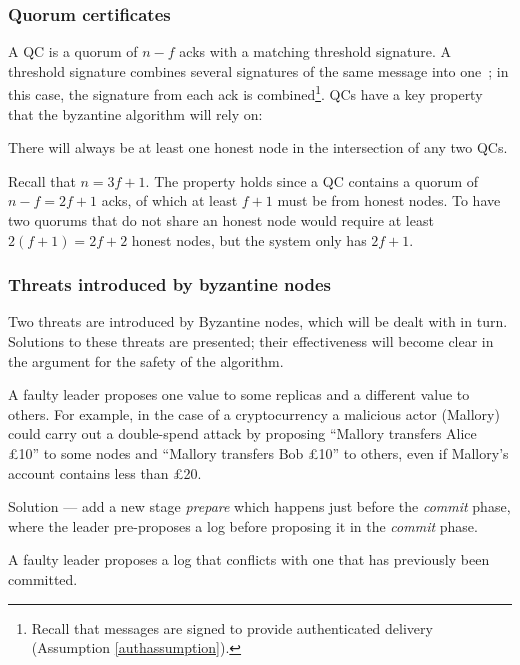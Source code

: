 \subsubsection{Quorum certificates}

A QC is a quorum of $n - f$ acks with a matching threshold signature. A threshold signature combines several signatures of the same message into one~\cite{shoupPracticalThresholdSignatures2000, cachinRandomOraclesConstantinople2005}; in this case, the signature from each ack is combined\footnote{Recall that messages are signed to provide authenticated delivery (Assumption \ref{authassumption}).}. QCs have a key property that the byzantine algorithm will rely on:

\begin{property} \label{qcproperty}
There will always be at least one honest node in the intersection of any two QCs.
\end{property}

Recall that $n = 3f + 1$. The property holds since a QC contains a quorum of $n - f = 2f + 1$ acks, of which at least $f + 1$ must be from honest nodes. To have two quorums that do not share an honest node would require at least $2(f + 1) = 2f + 2$ honest nodes, but the system only has $2f + 1$.

\subsubsection{Threats introduced by byzantine nodes}
Two threats are introduced by Byzantine nodes, which will be dealt with in turn. Solutions to these threats are presented; their effectiveness will become clear in the argument for the safety of the algorithm.

\begin{threat}[Equivocation] \label{threat1}
A faulty leader proposes one value to some replicas and a different value to others. For example, in the case of a cryptocurrency a malicious actor (Mallory) could carry out a double-spend attack by proposing ``Mallory transfers Alice £10'' to some nodes and ``Mallory transfers Bob £10'' to others, even if Mallory's account contains less than £20.
\end{threat}

Solution --- add a new stage \textit{prepare} which happens just before the \textit{commit} phase, where the leader pre-proposes a log before proposing it in the \textit{commit} phase.\\

\begin{threat} \label{threat2}
A faulty leader proposes a log that conflicts with one that has previously been committed.
\end{threat}

